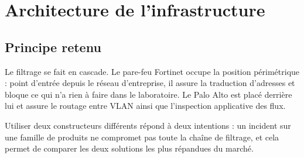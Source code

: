 \documentclass[11pt,a4paper]{article}
\begin{document}
\section{Architecture de l'infrastructure}

\subsection{Principe retenu}
Le filtrage se fait en cascade. Le pare-feu Fortinet occupe la position périmétrique : point d'entrée depuis le réseau d'entreprise, il assure la traduction d'adresses et bloque ce qui n'a rien à faire dans le laboratoire. Le Palo Alto est placé derrière lui et assure le routage entre VLAN ainsi que l'inspection applicative des flux.

Utiliser deux constructeurs différents répond à deux intentions : un incident sur une famille de produits ne compromet pas toute la chaîne de filtrage, et cela permet de comparer les deux solutions les plus répandues du marché.
\end{document}
